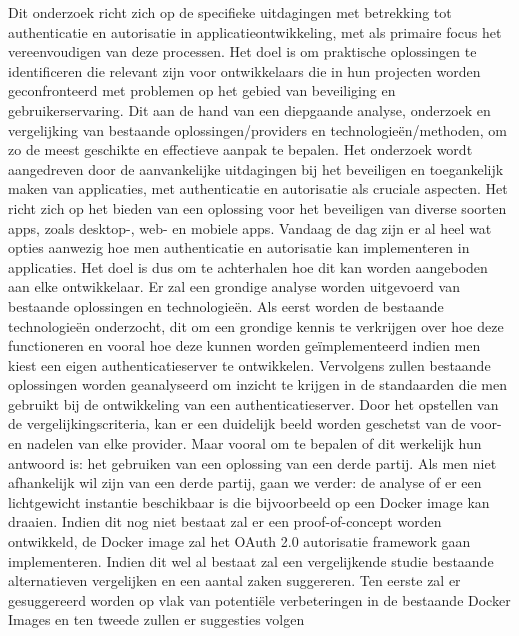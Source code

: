 Dit onderzoek richt zich op de specifieke uitdagingen met betrekking tot authenticatie en autorisatie in applicatieontwikkeling, met als primaire 
focus het vereenvoudigen van deze processen. Het doel is om praktische oplossingen te identificeren die relevant zijn voor ontwikkelaars 
die in hun projecten worden geconfronteerd met problemen op het gebied van beveiliging en gebruikerservaring. Dit aan de hand van een diepgaande analyse,
onderzoek en vergelijking van bestaande oplossingen/providers en technologieën/methoden, om zo de meest geschikte en effectieve aanpak te bepalen. 
\newline
\newline
Het onderzoek wordt aangedreven door de aanvankelijke uitdagingen bij het beveiligen en toegankelijk maken van applicaties, met authenticatie en 
autorisatie als cruciale aspecten. Het richt zich op het bieden van een oplossing voor het beveiligen van diverse soorten apps, zoals desktop-, 
web- en mobiele apps. Vandaag de dag zijn er al heel wat opties aanwezig hoe men authenticatie en autorisatie kan implementeren in applicaties.
Het doel is dus om te achterhalen hoe dit kan worden aangeboden aan elke ontwikkelaar.
\newline
\newline
Er zal een grondige analyse worden uitgevoerd van bestaande oplossingen en technologieën. Als eerst worden de bestaande technologieën onderzocht,
dit om een grondige kennis te verkrijgen over hoe deze functioneren en vooral hoe deze kunnen worden geïmplementeerd indien men kiest een eigen
authenticatieserver te ontwikkelen. Vervolgens zullen bestaande oplossingen worden geanalyseerd om inzicht te krijgen in de standaarden die
men gebruikt bij de ontwikkeling van een authenticatieserver. 
Door het opstellen van de vergelijkingscriteria, kan er een duidelijk beeld worden geschetst van de voor- en nadelen van elke provider.
Maar vooral om te bepalen of dit werkelijk hun antwoord is: het gebruiken van een oplossing van een derde partij. Als men niet afhankelijk wil zijn van 
een derde partij, gaan we verder: de analyse of er een lichtgewicht instantie beschikbaar is die bijvoorbeeld op een Docker image kan draaien.
Indien dit nog niet bestaat zal er een proof-of-concept worden ontwikkeld, de Docker image zal het OAuth 2.0 autorisatie framework gaan implementeren.
Indien dit wel al bestaat zal een vergelijkende studie bestaande alternatieven vergelijken en een aantal zaken suggereren.
Ten eerste zal er gesuggereerd worden op vlak van potentiële verbeteringen in de bestaande Docker Images en ten tweede zullen er suggesties volgen
